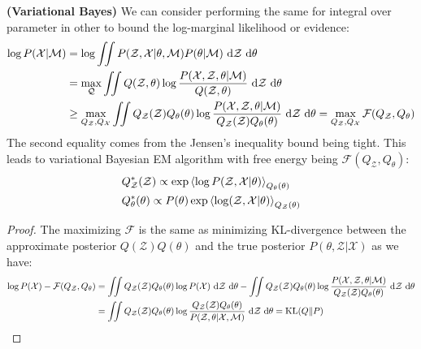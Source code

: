 \begin{proposition}{\textbf{(Variational Bayes)}}
    We can consider performing the same for integral over parameter in other to bound the log-marginal likelihood or evidence:
    \begin{equation*}
    \begin{aligned}
        \log P(\mathcal{X} |\mathcal{M}) &= \log \iint P(\mathcal{Z},\mathcal{X} | \theta, \mathcal{M}) P(\theta|\mathcal{M})\ \mathrm{d}\mathcal{Z}\ \mathrm{d}\theta \\
        &= \max_{\mathcal{Q}}\iint Q(\mathcal{Z}, \theta) \log \frac{P(\mathcal{X},\mathcal{Z},\theta|\mathcal{M})}{Q(\mathcal{Z}, \theta)}\ \mathrm{d}\mathcal{Z}\ \mathrm{d}\theta \\
        &\ge \max_{Q_\mathcal{Z},Q_\mathcal{X}} \iint Q_\mathcal{Z}(\mathcal{Z}) Q_\theta(\theta) \log \frac{P(\mathcal{X},\mathcal{Z},\theta|\mathcal{M})}{Q_\mathcal{Z}(\mathcal{Z}) Q_\theta(\theta)}\ \mathrm{d}\mathcal{Z}\ \mathrm{d}\theta = \max_{Q_\mathcal{Z},Q_\mathcal{X}}  \mathcal{F}(Q_\mathcal{Z}, Q_\theta) \\
    \end{aligned}
    \end{equation*}
    The second equality comes from the Jensen's inequality bound being tight. This leads to variational Bayesian EM algorithm with free energy being $\mathcal{F}(Q_\mathcal{Z}, Q_\theta)$:
    \begin{equation*}
    \begin{aligned}
        &Q^*_\mathcal{Z}(\mathcal{Z}) \propto \exp\left\langle \log P(\mathcal{Z}, \mathcal{X} | \theta) \right\rangle_{Q_\theta(\theta)} \\
        &Q^*_\theta(\theta) \propto P(\theta)\exp\left\langle \log (\mathcal{Z}, \mathcal{X}|\theta) \right\rangle_{Q_\mathcal{Z}(\theta)}
    \end{aligned}
    \end{equation*}
\end{proposition}
\begin{proof}
    The maximizing $\mathcal{F}$ is the same as minimizing KL-divergence between the approximate posterior $Q(\mathcal{Z})Q(\theta)$ and the true posterior $P(\theta,\mathcal{Z}|\mathcal{X})$ as we have:
    \begin{equation*}
    \begin{aligned}
        \log P(\mathcal{X}) - \mathcal{F}(Q_\mathcal{Z}, Q_\theta) &= \iint Q_\mathcal{Z}(\mathcal{Z})Q_\theta(\theta)\log P(\mathcal{X})\ \mathrm{d}\mathcal{Z}\ \mathrm{d}\theta - \iint Q_\mathcal{Z}(\mathcal{Z}) Q_\theta(\theta) \log \frac{P(\mathcal{X},\mathcal{Z},\theta|\mathcal{M})}{Q_\mathcal{Z}(\mathcal{Z}) Q_\theta(\theta)}\ \mathrm{d}\mathcal{Z}\ \mathrm{d}\theta \\
        &= \iint Q_\mathcal{Z}(\mathcal{Z}) Q_\theta(\theta) \log \frac{Q_\mathcal{Z}(\mathcal{Z}) Q_\theta(\theta)}{P(\mathcal{Z},\theta|\mathcal{X}, \mathcal{M})}\ \mathrm{d}\mathcal{Z}\ \mathrm{d}\theta = \operatorname{KL}(Q\| P)
    \end{aligned}
    \end{equation*}
\end{proof}

